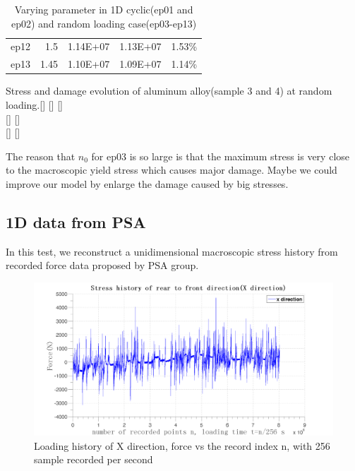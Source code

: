 \documentclass[3p,times,number,review]{elsarticle}
\begin{document}
\begin{table}[]
\begin{tabular}{lrrrr}
		ep12             & 1.5                                & 1.14E+07                                                                                   & 1.13E+07                                                                                             & 1.53\%                             \\
		ep13             & 1.45                               & 1.10E+07                                                                                   & 1.09E+07                                                                                             & 1.14\%                             \\ \hline
	\end{tabular}
	\caption{Varying parameter in 1D cyclic(ep01 and ep02) and random loading case(ep03-ep13)}
	\label{tab:n0}
\end{table}

\begin{Figure}[h!]{Stress and damage evolution of aluminum alloy(sample 3 and 4) at random loading.}[]
	\\
[]
[]
\\
[]
[]
	\label{ep0304}
\end{Figure}

The reason that $n_0$ for ep03 is so large is that the maximum stress is very close to the macroscopic yield stress which causes major damage. Maybe we could improve our model by enlarge the damage caused by big stresses. 

\iffalse
\newpage
\subsection{1D data from PSA}
In this test, we reconstruct a unidimensional macroscopic stress history from recorded force data proposed by PSA group. 
\begin{figure}[!h]
	\centering
	\includegraphics[width=\textwidth]{figures//x.png} 
	\caption{Loading history of X direction, force vs the record index n, with 256 sample recorded per second}
	\label{x}
\end{figure}
\end{document}
